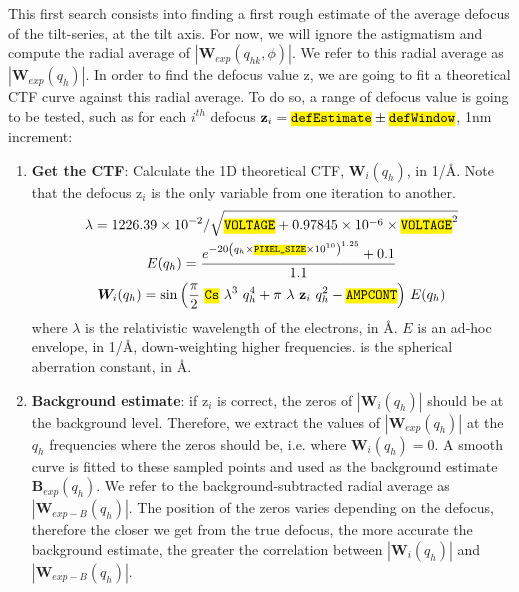 This first search consists into finding a first rough estimate of the average defocus of the tilt-series, at the tilt axis. For now, we will ignore the astigmatism and compute the radial average of $|\bm{W}_{exp}(q_{hk},\phi)|$. We refer to this radial average as $|\bm{W}_{exp}(q_{h})|$. In order to find the defocus value $\bm{\mathrm{z}}$, we are going to fit a theoretical CTF curve against this radial average. To do so, a range of defocus value is going to be tested, such as for each $i^{th}$ defocus $\bm{\mathrm{z}}_{i} = \code{defEstimate} \pm \code{defWindow}$, 1nm increment:
\begin{enumerate}
    \item \textbf{Get the CTF}: Calculate the 1D theoretical CTF, $\bm{W}_{i}(q_{h})$, in 1/\r{A}. Note that the defocus $\bm{\mathrm{z}}_i$ is the only variable from one iteration to another.
    \begin{gather}
        \lambda = {1226.39\times10^{-2}}/{\sqrt{\code{VOLTAGE} + 0.97845\times10^{-6}\times\code{VOLTAGE}^2}}\notag\\
        E(q_h) = \frac{ e^{ -20{\left( q_h \times \code{PIXEL\_SIZE}\times10^{10} \right)}^{1.25}} + 0.1 } {1.1}\notag\\
        \bm{W}_{i}(q_h) = \sin{ \left( \frac{\pi}{2}\ \code{Cs}\ \lambda^{3}\ q_h^4 + \pi\ \lambda\ \bm{\mathrm{z}}_i\ q_h^2 - \code{AMPCONT} \right)}\ E(q_h)\label{eq:ctf}
    \end{gather} %
    where $\lambda$ is the relativistic wavelength of the electrons, in \r{A}. $E$ is an ad-hoc envelope, in 1/\r{A}, down-weighting higher frequencies.  is the spherical aberration constant, in \r{A}.
        
    \item \textbf{Background estimate}: if $\bm{\mathrm{z}}_i$ is correct, the zeros of $|\bm{W}_i(q_h)|$ should be at the background level. Therefore, we extract the values of $|\bm{W}_{exp}(q_h)|$ at the $q_h$ frequencies where the zeros should be, i.e. where $\bm{W}_i(q_h)=0$. A smooth curve is fitted to these sampled points and used as the background estimate $\bm{B}_{exp}(q_h)$. We refer to the background-subtracted radial average as $|\bm{W}_{exp-B}(q_h)|$. The position of the zeros varies depending on the defocus, therefore the closer we get from the true defocus, the more accurate the background estimate, the greater the correlation between $|\bm{W}_i(q_h)|$ and $|\bm{W}_{exp-B}(q_h)|$.
        

\end{enumerate}
